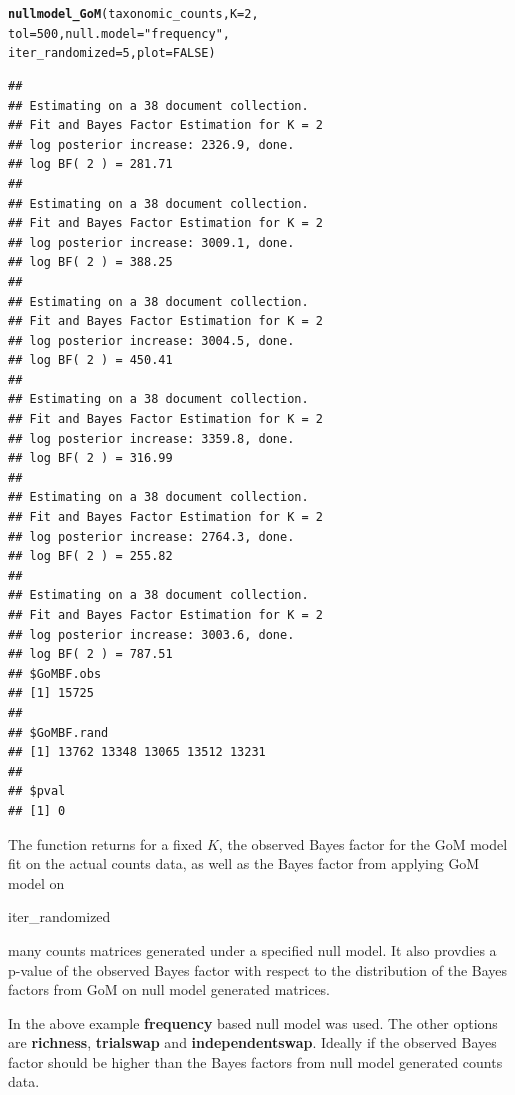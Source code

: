 \documentclass[12pt]{article}\usepackage[]{graphicx}\usepackage[usenames,dvipsnames]{color}
\makeatletter
\newcommand{\hlnum}[1]{\textcolor[rgb]{0.686,0.059,0.569}{#1}}%
\newcommand{\hlstr}[1]{\textcolor[rgb]{0.192,0.494,0.8}{#1}}%
\newcommand{\hlstd}[1]{\textcolor[rgb]{0.345,0.345,0.345}{#1}}%
\newcommand{\hlkwc}[1]{\textcolor[rgb]{0.333,0.667,0.333}{#1}}%
\newcommand{\hlkwd}[1]{\textcolor[rgb]{0.737,0.353,0.396}{\textbf{#1}}}%
\newenvironment{kframe}{%
 \def\at@end@of@kframe{}%
 \ifinner\ifhmode%
  \def\at@end@of@kframe{\end{minipage}}%
  \begin{minipage}{\columnwidth}%
 \fi\fi%
 \def\FrameCommand##1{\hskip\@totalleftmargin \hskip-\fboxsep
 \colorbox{shadecolor}{##1}\hskip-\fboxsep
     \hskip-\linewidth \hskip-\@totalleftmargin \hskip\columnwidth}%
 \MakeFramed {\advance\hsize-\width
   \@totalleftmargin\z@ \linewidth\hsize
   \@setminipage}}%
 {\par\unskip\endMakeFramed%
 \at@end@of@kframe}
\newenvironment{knitrout}{}{} %
\makeatother
\begin{document}
\begin{knitrout}
\color{fgcolor}\begin{kframe}
\begin{alltt}
\hlkwd{nullmodel_GoM}\hlstd{(taxonomic_counts,} \hlkwc{K}\hlstd{=}\hlnum{2}\hlstd{,}
               \hlkwc{tol}\hlstd{=}\hlnum{500}\hlstd{,} \hlkwc{null.model}\hlstd{=}\hlstr{"frequency"}\hlstd{,}
               \hlkwc{iter_randomized}\hlstd{=}\hlnum{5}\hlstd{,} \hlkwc{plot}\hlstd{=}\hlnum{FALSE}\hlstd{)}
\end{alltt}
\begin{verbatim}
## 
## Estimating on a 38 document collection.
## Fit and Bayes Factor Estimation for K = 2
## log posterior increase: 2326.9, done.
## log BF( 2 ) = 281.71
## 
## Estimating on a 38 document collection.
## Fit and Bayes Factor Estimation for K = 2
## log posterior increase: 3009.1, done.
## log BF( 2 ) = 388.25
## 
## Estimating on a 38 document collection.
## Fit and Bayes Factor Estimation for K = 2
## log posterior increase: 3004.5, done.
## log BF( 2 ) = 450.41
## 
## Estimating on a 38 document collection.
## Fit and Bayes Factor Estimation for K = 2
## log posterior increase: 3359.8, done.
## log BF( 2 ) = 316.99
## 
## Estimating on a 38 document collection.
## Fit and Bayes Factor Estimation for K = 2
## log posterior increase: 2764.3, done.
## log BF( 2 ) = 255.82
## 
## Estimating on a 38 document collection.
## Fit and Bayes Factor Estimation for K = 2
## log posterior increase: 3003.6, done.
## log BF( 2 ) = 787.51
## $GoMBF.obs
## [1] 15725
## 
## $GoMBF.rand
## [1] 13762 13348 13065 13512 13231
## 
## $pval
## [1] 0
\end{verbatim}
\end{kframe}
\end{knitrout}

The function returns for a fixed $K$, the observed Bayes factor for the GoM model fit on the actual counts data, as well as the Bayes factor from applying GoM model on \begin{verb} iter_randomized \end{verb} many counts matrices generated under a specified null model. It also provdies a p-value of the observed Bayes factor with respect to the distribution of the Bayes factors from GoM on null model generated matrices.

In the above example \textbf{frequency} based null model was used. The other options are \textbf{richness}, \textbf{trialswap} and \textbf{independentswap}. Ideally if the observed Bayes factor should be higher than the Bayes factors from null model generated counts data.
\end{document}
